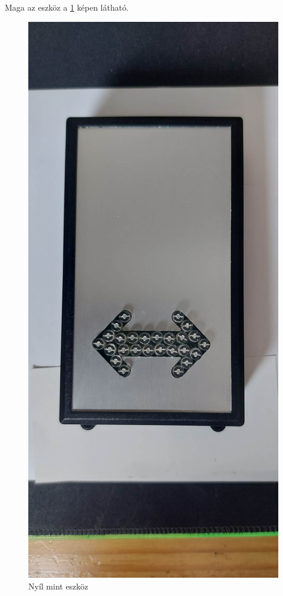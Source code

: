 \documentclass[tocnopagenum]{thesis-ekf}
\theoremstyle{definition}
\theoremstyle{remark}
\begin{document}
	Maga az eszköz a \ref{fig:nyil01} képen látható.	\begin{figure}[H]	
		\centering
		\includegraphics[scale=0.12]{nyil01}
		\caption[Nyíl eszköz]{Nyíl mint eszköz}
		\label{fig:nyil01}
	\end{figure}
\newpage
\end{document}
